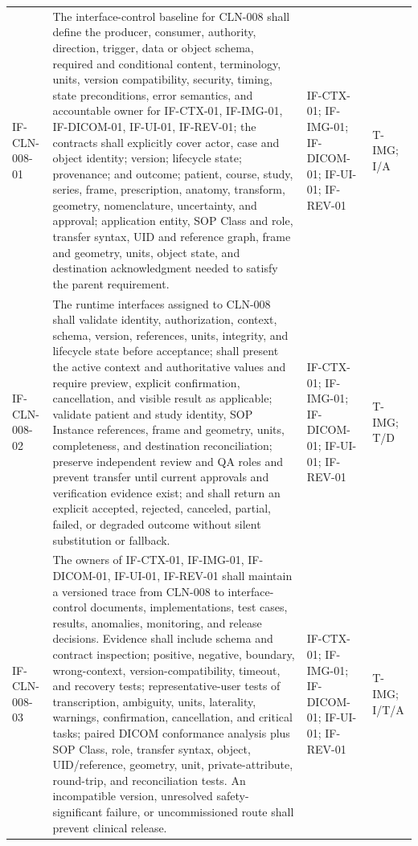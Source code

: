 \documentclass[11pt,letterpaper]{article}
\begin{document}
\begin{scriptsize}
\begin{longtable}{@{}L{0.14\textwidth}L{0.49\textwidth}L{0.19\textwidth}L{0.10\textwidth}@{}}
\mbox{IF-CLN-008-01} & The interface-control baseline for CLN-008 shall define the producer, consumer, authority, direction, trigger, data or object schema, required and conditional content, terminology, units, version compatibility, security, timing, state preconditions, error semantics, and accountable owner for IF-CTX-01, IF-IMG-01, IF-DICOM-01, IF-UI-01, IF-REV-01; the contracts shall explicitly cover actor, case and object identity; version; lifecycle state; provenance; and outcome; patient, course, study, series, frame, prescription, anatomy, transform, geometry, nomenclature, uncertainty, and approval; application entity, SOP Class and role, transfer syntax, UID and reference graph, frame and geometry, units, object state, and destination acknowledgment needed to satisfy the parent requirement. & IF-CTX-01; IF-IMG-01; IF-DICOM-01; IF-UI-01; IF-REV-01 & T-IMG; I\slash\allowbreak{}A \\
\addlinespace[2pt]
\mbox{IF-CLN-008-02} & The runtime interfaces assigned to CLN-008 shall validate identity, authorization, context, schema, version, references, units, integrity, and lifecycle state before acceptance; shall present the active context and authoritative values and require preview, explicit confirmation, cancellation, and visible result as applicable; validate patient and study identity, SOP Instance references, frame and geometry, units, completeness, and destination reconciliation; preserve independent review and QA roles and prevent transfer until current approvals and verification evidence exist; and shall return an explicit accepted, rejected, canceled, partial, failed, or degraded outcome without silent substitution or fallback. & IF-CTX-01; IF-IMG-01; IF-DICOM-01; IF-UI-01; IF-REV-01 & T-IMG; T\slash\allowbreak{}D \\
\addlinespace[2pt]
\mbox{IF-CLN-008-03} & The owners of IF-CTX-01, IF-IMG-01, IF-DICOM-01, IF-UI-01, IF-REV-01 shall maintain a versioned trace from CLN-008 to interface-control documents, implementations, test cases, results, anomalies, monitoring, and release decisions. Evidence shall include schema and contract inspection; positive, negative, boundary, wrong-context, version-compatibility, timeout, and recovery tests; representative-user tests of transcription, ambiguity, units, laterality, warnings, confirmation, cancellation, and critical tasks; paired DICOM conformance analysis plus SOP Class, role, transfer syntax, object, UID\slash\allowbreak{}reference, geometry, unit, private-attribute, round-trip, and reconciliation tests. An incompatible version, unresolved safety-significant failure, or uncommissioned route shall prevent clinical release. & IF-CTX-01; IF-IMG-01; IF-DICOM-01; IF-UI-01; IF-REV-01 & T-IMG; I\slash\allowbreak{}T\slash\allowbreak{}A \\

\end{longtable}
\end{scriptsize}
\end{document}
